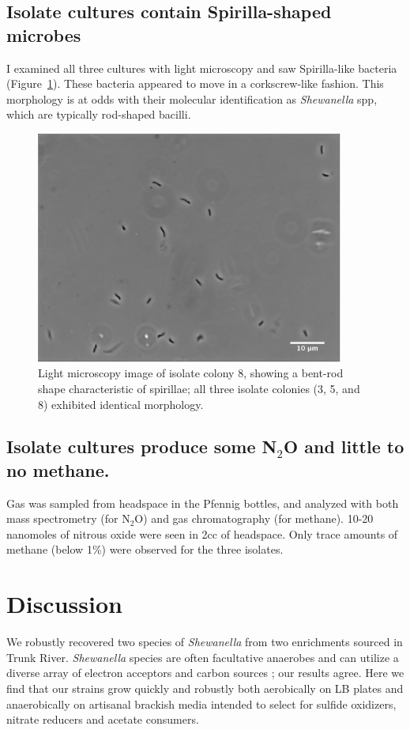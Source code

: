 \documentclass{article}
\begin{document}
\subsection*{Isolate cultures contain Spirilla-shaped microbes}

I examined all three cultures with light microscopy and saw
Spirilla-like bacteria (Figure~\ref{fig:spirilla}).  These bacteria
appeared to move in a corkscrew-like fashion.  This morphology is at
odds with their molecular identification as {\em Shewanella} spp, which are
typically rod-shaped bacilli.

\begin{figure}[!ht]
  \centerline{\includegraphics[width=4in]{spirilla.png}}
  \caption{Light microscopy image of isolate colony 8, showing a
    bent-rod shape characteristic of spirillae; all three isolate
    colonies (3, 5, and 8) exhibited identical morphology.}
  \label{fig:spirilla}
\end{figure}

\subsection*{Isolate cultures produce some N$_2$O and little to no methane.}

Gas was sampled from headspace in the Pfennig bottles, and analyzed
with both mass spectrometry (for N$_2$O) and gas chromatography (for
methane).  10-20 nanomoles of nitrous oxide were seen in 2cc of
headspace.  Only trace amounts of methane (below 1\%) were observed
for the three isolates.

\section*{Discussion}

We robustly recovered two species of {\em Shewanella} from two
enrichments sourced in Trunk River.  {\em Shewanella} species are
often facultative anaerobes and can utilize a diverse array of
electron acceptors and carbon sources
\cite{venkateswaran1999polyphasic}; our results agree.  Here we find
that our strains grow quickly and robustly both aerobically on LB
plates and anaerobically on artisanal brackish media intended to
select for sulfide oxidizers, nitrate reducers and acetate consumers.
\end{document}
